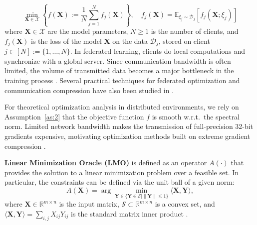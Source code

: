 \documentclass{article}
\begin{document}
\begin{equation}
\min_{\mathbf{X} \in \mathcal{X}} \left\{ f(\mathbf{X}) := \frac{1}{N}\sum_{j=1}^N f_j(\mathbf{X})\right\}, \quad f_j(\mathbf{X})=\mathbb{E}_{\xi_j\sim\mathcal{D}_j}[f_j(\mathbf{X};\xi_j)]
\label{fed_eq}
\end{equation}
where $\mathbf{X} \in \mathcal{X}$ are the model parameters, $N \ge 1$ is the number of clients, and $f_j(\mathbf{X})$ is the loss of the model $\mathbf{X}$ on the data $\mathcal{D}_j$, stored on client $j \in [N] := \{1, \dots, N\}$. In federated learning, clients do local computations and synchronize with a global server. Since communication bandwidth is often limited, the volume of transmitted data becomes a major bottleneck in the training process \cite{bernstein2019signsgdmajority, horvath2023stochastic}. Several practical techniques for federated optimization and communication compression have also been studied in \cite{beznosikov2020biased, gruntkowska2025error, ahn2025dion}.

For theoretical optimization analysis in distributed environments, we rely on Assumption~\ref{as:2} that the objective function $f$ is smooth w.r.t.\ the spectral norm. 
Limited network bandwidth makes the transmission of full-precision 32-bit gradients expensive, motivating optimization methods built on extreme gradient compression \cite{bernstein2018signsgd, bernstein2019signsgdmajority, beznosikov2020biased}.

\textbf{Linear Minimization Oracle (LMO)} is defined as an operator  $A(\cdot)$ that provides the solution to a linear minimization problem over a feasible set. In particular, the constraints can be defined via the unit ball of a given norm:
\begin{equation}
A(\mathbf{X})=\arg\min_{\mathbf{Y} \in \{ \mathbf{Y} \in \mathcal{S} | \|\mathbf{Y}\| \le1\}}\langle \mathbf{X}, \mathbf{Y}\rangle,
\end{equation}
where $\mathbf{X}\in\mathbb{R}^{m\times n}$ is the input matrix, $\mathcal{S}\subset\mathbb{R}^{m\times n}$  is a convex set, and $\langle \mathbf{X},\mathbf{Y}\rangle=\sum_{i,j}{X}_{ij}{Y}_{ij}$ is the standard matrix inner product \cite{pethick2025training}. 
\end{document}
